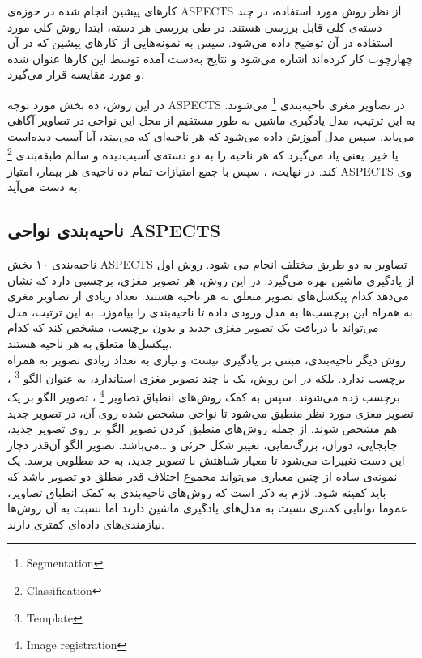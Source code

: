

کارهای پیشین انجام شده در حوزه‌ی ASPECTS از نظر روش مورد استفاده، در چند دسته‌ی کلی قابل بررسی هستند.
در طی بررسی هر دسته، ابتدا روش کلی مورد استفاده در آن توضیح داده می‌شود. 
سپس به نمونه‌هایی از کارهای پیشین که در آن چهارچوب کار کرده‌اند اشاره می‌شود
و نتایج به‌دست آمده توسط این کار‌ها عنوان شده و مورد مقایسه قرار می‌گیرد.

در این روش، ده بخش مورد توجه ASPECTS در تصاویر مغزی ناحیه‌بندی
\footnote{Segmentation}
 می‌شوند.
به این ترتیب،  
مدل یادگیری ماشین به طور مستقیم از محل این نواحی در تصاویر آگاهی می‌یابد.
سپس مدل آموزش داده می‌شود که هر ناحیه‌ای که می‌بیند، آیا آسیب دیده‌است یا خیر.
یعنی یاد می‌گیرد که هر ناحیه را به دو دسته‌ی آسیب‌دیده و سالم طبقه‌بندی
\footnote{Classification}
کند.
در نهایت، ، سپس با جمع امتیازات تمام ده ناحیه‌ی هر بیمار، امتیاز ASPECTS وی به دست می‌آید.\\

\subsection{ناحیه‌بندی نواحی ASPECTS}
ناحیه‌بندی ۱۰ بخش ASPECTS تصاویر به دو طریق مختلف انجام می شود.
روش اول از یادگیری ماشین بهره می‌گیرد.
در این روش، هر تصویر مغزی، برچسبی دارد که نشان می‌دهد کدام پیکسل‌های تصویر متعلق به هر ناحیه هستند.
تعداد زیادی از تصاویر مغزی به همراه این برچسب‌ها به مدل ورودی داده تا ناحیه‌بندی را بیاموزد.
به این ترتیب، مدل می‌تواند با دریافت یک تصویر مغزی جدید و بدون برچسب، مشخص کند که کدام پیکسل‌ها متعلق به هر ناحیه هستند.\\

روش دیگر ناحیه‌بندی، مبتنی بر یادگیری نیست و نیازی به تعداد زیادی تصویر به همراه برچسب ندارد.
بلکه در این روش، یک یا چند تصویر مغزی استاندارد، به عنوان الگو
\footnote{Template}
، برچسب زده می‌شوند.
سپس به کمک روش‌های انطباق تصاویر
\footnote{Image registration}
، تصویر الگو بر یک تصویر مغزی مورد نظر منطبق می‌شود تا نواحی مشخص شده روی آن، در تصویر جدید هم مشخص شوند.
از جمله روش‌های منطبق کردن تصویر الگو بر روی تصویر جدید، جابجایی، دوران، بزرگ‌نمایی، تغییر شکل جزئی و \dots می‌باشد.
تصویر الگو آن‌قدر دچار این دست تغییرات می‌شود تا معیار شباهتش با تصویر جدید، به حد مطلوبی برسد.
یک نمونه‌ی ساده از چنین معیاری می‌تواند مجموع اختلاف قدر مطلق دو تصویر باشد که باید کمینه شود.
لازم به ذکر است که روش‌های ناحیه‌بندی به کمک انطباق تصاویر، عموما توانایی کمتری نسبت به مدل‌های 
یادگیری ماشین دارند اما نسبت به آن روش‌ها نیازمندی‌های داده‌ای کمتری دارند.\\

